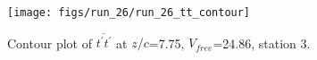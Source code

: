 \begin{figure}[H]
\centering
\texttt{[image: figs/run\_26/run\_26\_tt\_contour]}
\caption{Contour plot of $\overline{t^\prime t^\prime}$ at $z/c$=7.75, $V_{free}$=24.86, station 3.}
\label{fig:run_26_tt_contour}
\end{figure}


